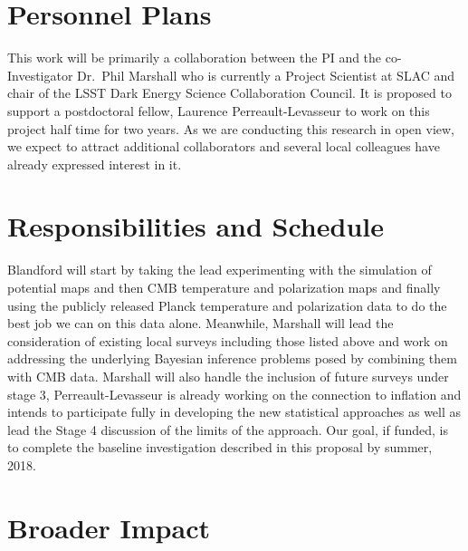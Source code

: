 \documentclass[psfig,11pt]{article}
\begin{document}

\section{Personnel Plans}

This work will be primarily a collaboration between the PI and the co-Investigator Dr.\ Phil Marshall who is currently a Project Scientist at SLAC and chair of the LSST Dark Energy Science Collaboration Council. It is proposed to support a postdoctoral fellow, Laurence Perreault-Levasseur to work on this project half time for two years. As we are conducting this research in open view, we expect to attract additional collaborators and several local colleagues have already expressed interest in it.


\section{Responsibilities and Schedule}

Blandford will start by taking the lead experimenting with the simulation of potential maps and then CMB temperature and polarization maps and finally using the publicly released Planck temperature and polarization data to do the best job we can on this data alone. Meanwhile, Marshall will lead the consideration of existing local surveys including those listed above and work on addressing the underlying Bayesian inference problems posed by combining them with CMB data. Marshall will also handle the inclusion of future surveys under stage 3, Perreault-Levasseur is already working on the connection to inflation and intends to participate fully in developing the new statistical approaches as well as lead the Stage 4 discussion of the limits of the approach. Our goal, if funded, is to complete the baseline investigation described in this proposal by summer, 2018.


\section{Broader Impact}
\end{document}
